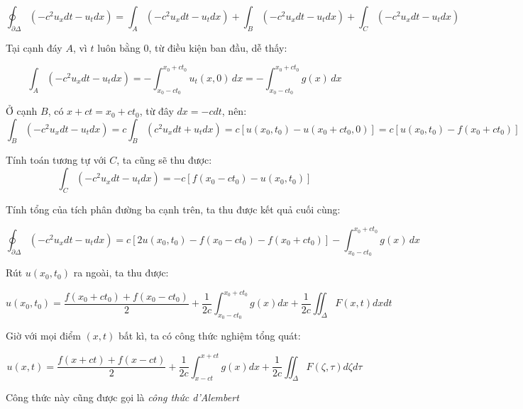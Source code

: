 \documentclass[a4paper]{article}
\begin{document}
\begin{equation*}
\oint_{\partial \Delta} (-c^2u_x dt - u_t dx) = \int_A (-c^2u_x dt - u_t dx) + \int_B (-c^2u_x dt - u_t dx) + \int_C (-c^2u_x dt - u_t dx)
\end{equation*}

Tại cạnh đáy $A$, vì $t$ luôn bằng $0$, từ điều kiện ban đầu, dễ thấy:

\begin{equation*}
\int_A (-c^2u_x dt - u_t dx) = -\int_{x_0 - ct_0}^{x_0 + ct_0} u_t(x, 0)\, dx = -\int_{x_0 - ct_0}^{x_0 + ct_0} g(x) \,dx
\end{equation*}

Ở cạnh $B$, có $x + ct = x_0 + ct_0$, từ đây $dx = -cdt$, nên:
\begin{equation*}
    \int_B (-c^2u_x dt - u_t dx) = c\int_B (c^2u_x dt + u_t dx) = c[u(x_0,t_0) - u(x_0 + ct_0, 0)] = c[u(x_0,t_0) - f(x_0 + ct_0)]
\end{equation*}

Tính toán tương tự với $C$, ta cũng sẽ thu được:
\begin{equation*}
    \int_C (-c^2u_x dt - u_t dx) = -c[f(x_0 - ct_0) - u(x_0,t_0)]
\end{equation*}

Tính tổng của tích phân đường ba cạnh trên, ta thu được kết quả cuối cùng:

\begin{equation*}
\oint_{\partial \Delta} (-c^2u_x dt - u_t dx) = c[2u(x_0, t_0) - f(x_0 - ct_0) - f(x_0 + ct_0)] -\int_{x_0 - ct_0}^{x_0 + ct_0} g(x) \,dx
\end{equation*}

Rút $u(x_0, t_0)$ ra ngoài, ta thu được:

\begin{equation*}
u(x_0, t_0) = \frac{f(x_0 + ct_0) + f(x_0 - ct_0)}{2} + \frac{1}{2c}\int_{x_0 - ct_0}^{x_0 + ct_0} g(x)dx + \frac{1}{2c} \iint_{\Delta} F(x,t)dx dt
\end{equation*}

Giờ với mọi điểm $(x, t)$ bất kì, ta có công thức nghiệm tổng quát:

\begin{equation*}
u(x, t) = \frac{f(x + ct) + f(x - ct)}{2} + \frac{1}{2c}\int_{x - ct}^{x + ct} g(x)dx + \frac{1}{2c} \iint_{\Delta} F(\zeta,\tau)d\zeta d\tau
\end{equation*}

Công thức này cũng được gọi là \emph{công thức d'Alembert}
\end{document}
